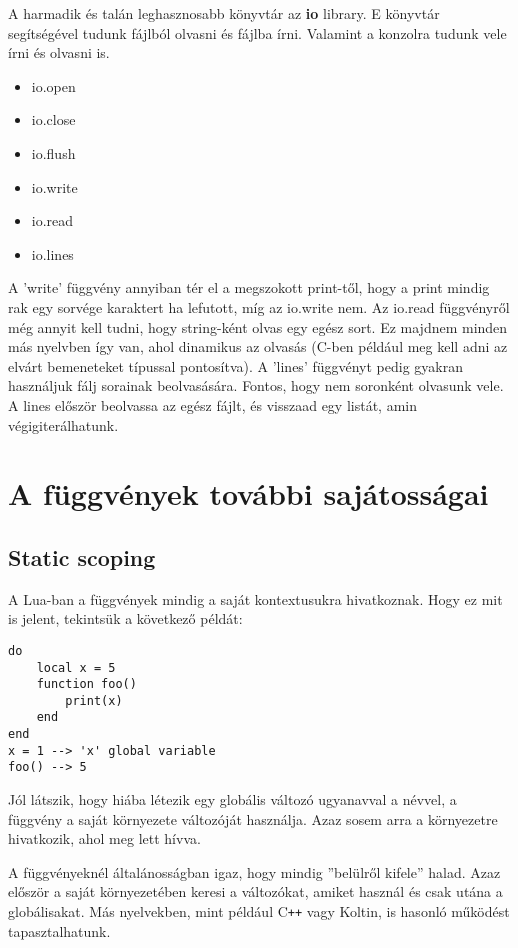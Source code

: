 A harmadik és talán leghasznosabb könyvtár az \textbf{io} library. E könyvtár segítségével tudunk fájlból olvasni és fájlba írni. Valamint a konzolra tudunk vele írni és olvasni is.
\begin{itemize}
	\item io.open
	\item io.close
	\item io.flush
	\item io.write
	\item io.read
	\item io.lines
\end{itemize}
A 'write' függvény annyiban tér el a megszokott print-től, hogy a print mindig rak egy sorvége karaktert ha lefutott, míg az io.write nem. Az io.read függvényről még annyit kell tudni, hogy string-ként olvas egy egész sort. Ez majdnem minden más nyelvben így van, ahol dinamikus az olvasás (C-ben például meg kell adni az elvárt bemeneteket típussal pontosítva). A 'lines' függvényt pedig gyakran használjuk fálj sorainak beolvasására. Fontos, hogy nem soronként olvasunk vele. A lines először beolvassa az egész fájlt, és visszaad egy listát, amin végigiterálhatunk. 

\newpage

\section{A függvények további sajátosságai}
\label{sec:l_more_fun}

\subsection{Static scoping}

A Lua-ban a függvények mindig a saját kontextusukra hivatkoznak. Hogy ez mit is jelent, tekintsük a következő példát:
\scriptsize
\begin{lstlisting}
do
	local x = 5
	function foo()
		print(x)
	end
end
x = 1 --> 'x' global variable
foo() --> 5
\end{lstlisting}
\normalsize
Jól látszik, hogy hiába létezik egy globális változó ugyanavval a névvel, a függvény a saját környezete változóját használja. Azaz sosem arra a környezetre hivatkozik, ahol meg lett hívva. 

A függvényeknél általánosságban igaz, hogy mindig ''belülről kifele'' halad. Azaz először a saját környezetében keresi a változókat, amiket használ és csak utána a globálisakat. Más nyelvekben, mint például C\verb|++| vagy Koltin, is hasonló működést tapasztalhatunk.

